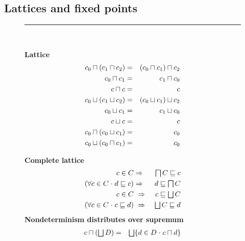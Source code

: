 \documentclass[fleqn]{fac}
\newcommand{\figurerule}{\rule{\textwidth}{0.5pt}}
\newcommand{\labelaxiom}[1]{\label{axiom-#1}\index{Axiom!#1|AxiomDef{\ref{axiom-#1}}}}
\newcommand{\nondet}{\mathbin{\sqcap}}
\newcommand{\Nondet}{\mathop{\textstyle\bigsqcap}}
\newcommand{\angelic}{\mathbin{\sqcup}}
\newcommand{\Angelic}{\mathop{\textstyle\bigsqcup}}
\begin{document}
\subsection{Lattices and fixed points}\label{section:lattices}


\begin{figure}
\figurerule\\[1ex]
\begin{minipage}{0.48\textwidth}
\textbf{Lattice}
\begin{eqnarray}
  c_0 \nondet (c_1 \nondet c_2) & = & (c_0 \nondet c_1) \nondet c_2 \labelaxiom{infimum-associative}\\
  c_0 \nondet c_1 & = & c_1 \nondet c_0 \labelaxiom{infimum-commutes} \\
  c \nondet c & = & c \labelaxiom{infimum-idempotent} \\
  c_0 \angelic (c_1 \angelic c_2) & = & (c_0 \angelic c_1) \angelic c_2 \labelaxiom{supremum-associative}\\
  c_0 \angelic c_1 & = & c_1 \angelic c_0 \labelaxiom{supremum-commutes} \\
  c \angelic c & = & c \labelaxiom{supremum-idempotent} \\
  c_0 \nondet (c_0 \angelic c_1) & = & c_0 \labelaxiom{infimum-absorb-supremum} \\
  c_0 \angelic (c_0 \nondet c_1) & = & c_0  \labelaxiom{supremum-absorb-infimum}
\end{eqnarray}
\end{minipage}
\quad
\begin{minipage}{0.48\textwidth}
\textbf{Complete lattice}
\begin{eqnarray}
  c \in C & \implies & \Nondet C \refsto c \labelaxiom{infimum-lower-bound} \\
  (\forall c \in C \spot d \refsto c) & \implies & d \refsto \Nondet C \labelaxiom{infimum-greatest-lower-bound} \\
  c \in C & ~\implies~ & c \refsto \Angelic C \labelaxiom{supremum-upper-bound} \\
  (\forall c \in C \spot c \refsto d) & ~\implies~ & \Angelic C \refsto d \labelaxiom{supremum-least-upper-bound}
\end{eqnarray}
\textbf{Nondeterminism distributes over supremum}
\begin{eqnarray}
  c \nondet (\Angelic D) & = & \Angelic \{ d \in D \spot c \nondet d \} \labelaxiom{infimum-distribute-supremum} 
\end{eqnarray}
\end{minipage}

\end{figure}
\end{document}
